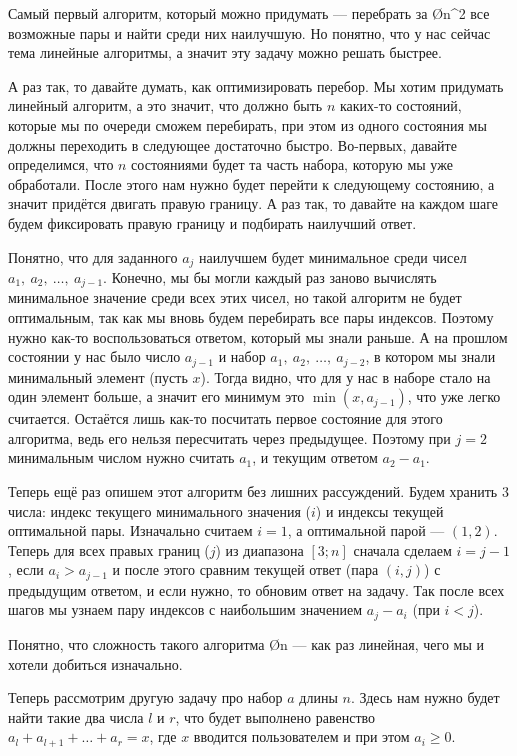 Самый первый алгоритм, который можно придумать — перебрать за \O{n^2} все возможные пары и найти среди них наилучшую. Но понятно, что у нас сейчас тема линейные алгоритмы, а значит эту задачу можно решать быстрее.

А раз так, то давайте думать, как оптимизировать перебор. Мы хотим придумать линейный алгоритм, а это значит, что должно быть $n$ каких-то состояний, которые мы по очереди сможем перебирать, при этом из одного состояния мы должны переходить в следующее достаточно быстро. Во-первых, давайте определимся, что $n$ состояниями будет та часть набора, которую мы уже обработали. После этого нам нужно будет перейти к следующему состоянию, а значит придётся двигать правую границу. А раз так, то давайте на каждом шаге будем фиксировать правую границу и подбирать наилучший ответ.

Понятно, что для заданного $a_j$ наилучшем будет минимальное среди чисел $a_1,\ a_2,\ \ldots,\ a_{j - 1}$. Конечно, мы бы могли каждый раз заново вычислять минимальное значение среди всех этих чисел, но такой алгоритм не будет оптимальным, так как мы вновь будем перебирать все пары индексов. Поэтому нужно как-то воспользоваться ответом, который мы знали раньше. А на прошлом состоянии у нас было число $a_{j - 1}$ и набор $a_1,\ a_2,\ \ldots,\ a_{j - 2}$, в котором мы знали минимальный элемент (пусть $x$). Тогда видно, что для у нас в наборе стало на один элемент больше, а значит его минимум это $\min(x, a_{j - 1})$, что уже легко считается. Остаётся лишь как-то посчитать первое состояние для этого алгоритма, ведь его нельзя пересчитать через предыдущее. Поэтому при $j = 2$ минимальным числом нужно считать $a_1$, и текущим ответом $a_2 - a_1$.

Теперь ещё раз опишем этот алгоритм без лишних рассуждений. Будем хранить 3 числа: индекс текущего минимального значения ($i$) и индексы текущей оптимальной пары. Изначально считаем $i = 1$, а оптимальной парой — $(1, 2)$. Теперь для всех правых границ ($j$) из диапазона $[3; n]$ сначала сделаем $i = j - 1$, если $a_i > a_{j - 1}$ и после этого сравним текущей ответ (пара $(i, j)$) с предыдущим ответом, и если нужно, то обновим ответ на задачу. Так после всех шагов мы узнаем пару индексов с наибольшим значением $a_j - a_i$ (при $i < j$).

Понятно, что сложность такого алгоритма \O{n} — как раз линейная, чего мы и хотели добиться изначально.


Теперь рассмотрим другую задачу про набор $a$ длины $n$. Здесь нам нужно будет найти такие два числа $l$ и $r$, что будет выполнено равенство $a_l + a_{l + 1} + \ldots + a_r = x$, где $x$ вводится пользователем и при этом $a_i \geq 0$.

